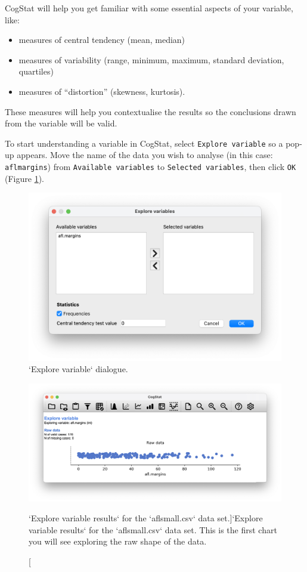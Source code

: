 \documentclass[
  11pt,
]{book}
\providecommand{\tightlist}{%
  \setlength{\itemsep}{0pt}\setlength{\parskip}{0pt}}
\theoremstyle{indenteddefinition}
\theoremstyle{indenteddefinition}
\theoremstyle{definition}
\theoremstyle{definition}
\theoremstyle{remark}
\begin{document}
CogStat will help you get familiar with some essential aspects of your variable, like:

\begin{itemize}
\tightlist
\item
  measures of central tendency (mean, median)
\item
  measures of variability (range, minimum, maximum, standard deviation, quartiles)
\item
  measures of ``distortion'' (skewness, kurtosis).
\end{itemize}

These measures will help you contextualise the results so the conclusions drawn from the variable will be valid.

To start understanding a variable in CogStat, select \texttt{Explore\ variable} so a pop-up appears. Move the name of the data you wish to analyse (in this case: \texttt{aflmargins}) from \texttt{Available\ variables} to \texttt{Selected\ variables}, then click \texttt{OK} (Figure \ref{fig:explorevariabledialog}).

\begin{figure}

{\centering \includegraphics[width=0.66\linewidth]{resources/image/explorevariable} 

}

\caption{`Explore variable` dialogue.}\label{fig:explorevariabledialog}
\end{figure}

\begin{figure}

{\centering \includegraphics[width=0.66\linewidth]{resources/image/cogstatrawaflsmall} 

}

\caption[`Explore variable results` for the `aflsmall.csv` data set.]{`Explore variable results` for the `aflsmall.csv` data set. This is the first chart you will see exploring the raw shape of the data.}\label{fig:rawaflsmall}
\end{figure}
\end{document}
